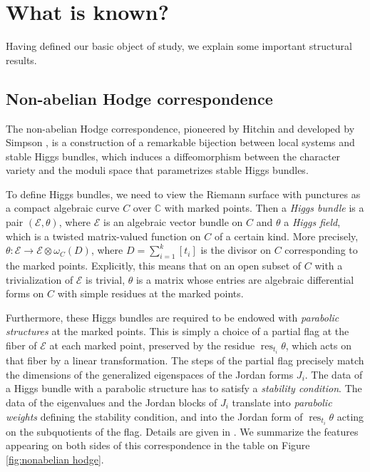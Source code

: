 \documentclass[12pt]{amsart}
\theoremstyle{definition}
\theoremstyle{remark}
\numberwithin{equation}{section}
\newcommand{\BC}{\mathbb C}
\DeclareMathOperator{\res}{res}
\begin{document}
	\section{What is known?}
	Having defined our basic object of study, we explain some important structural results.
	
	\subsection{Non-abelian Hodge correspondence}
	The non-abelian Hodge correspondence, pioneered by Hitchin \cite{hitchin1987self} and developed by Simpson \cite{simpson1990harmonic, simpson1991nonabelian, simpson1992higgs}, is a construction of a remarkable bijection between local systems and stable Higgs bundles, which induces a diffeomorphism between the character variety and the moduli space that parametrizes stable Higgs bundles.
	
	To define Higgs bundles, we need to view the Riemann surface with punctures as a compact algebraic curve $C$ over $\BC$ with marked points. Then a \emph{Higgs bundle} is a pair $(\mathcal{E}, \theta)$, where $\mathcal{E}$ is an algebraic vector bundle on $C$ and $\theta$ a \emph{Higgs field}, which is a twisted matrix-valued function on $C$ of a certain kind. More precisely, $\theta:\mathcal{E}\to\mathcal{E}\otimes\omega_C(D)$, where $D=\sum_{i=1}^k [t_i]$ is the divisor on $C$ corresponding to the marked points. Explicitly, this means that on an open subset of $C$ with a trivialization of $\mathcal{E}$ is trivial, $\theta$ is a matrix whose entries are algebraic differential forms on $C$ with simple residues at the marked points.
	
	Furthermore, these Higgs bundles are required to be endowed with \emph{parabolic structures} at the marked points. This is simply a choice of a partial flag at the fiber of $\mathcal{E}$ at each marked point, preserved by the residue $\res_{t_i} \theta$, which acts on that fiber by a linear transformation. The steps of the partial flag precisely match the dimensions of the generalized eigenspaces of the Jordan forms $J_i$. The data of a Higgs bundle with a parabolic structure has to satisfy a \emph{stability condition}. The data of the eigenvalues and the Jordan blocks of $J_i$ translate into \emph{parabolic weights} defining the stability condition, and into the Jordan form of $\res_{t_i} \theta$ acting on the subquotients of the flag. Details are given in \cite{simpson1990harmonic}. We summarize the features appearing on both sides of this correspondence in the table on Figure \ref{fig:nonabelian hodge}.
	
\end{document}

